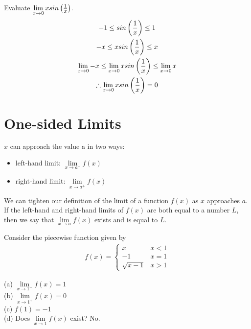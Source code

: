 \begin{exercise}\nonumber
	Evaluate $ \lim\limits_{x \rightarrow 0}xsin\left({1 \over x}\right) $. \\
	\begin{gather*}
		-1 \le  sin\left({1 \over x}\right) \le 1 \\
		-x \le xsin\left({1 \over x}\right) \le x \\
		\lim\limits_{x \rightarrow 0}-x \le \lim\limits_{x \rightarrow 0}xsin\left({1 \over x}\right) \le \lim\limits_{x \rightarrow 0}x \\
		\therefore \lim\limits_{x \rightarrow 0}xsin\left({1 \over x}\right) = 0
	\end{gather*}
\end{exercise}

\section{One-sided Limits}

$ x $ can approach the value a in two ways: \\

\begin{itemize}
	\item
	      left-hand limit: $ \lim\limits_{x \rightarrow a^-}f(x) $ \\

	\item
	      right-hand limit: $ \lim\limits_{x \rightarrow a^+}f(x) $ \\
\end{itemize}

We can tighten our definition of the limit of a function $ f(x) $ as $ x $ approaches $ a $. If the left-hand and right-hand limits of $ f(x) $ are both equal to a number $ L $, then we say that $ \lim\limits_{x \rightarrow a}f(x) $ exists and is equal to $ L $. \\

\begin{exercise}\nonumber
	Consider the piecewise function given by \\
	\begin{align}
		f(x) = \begin{cases}
			x          & x < 1 \\
			-1         & x = 1 \\
			\sqrt{x-1} & x > 1
		\end{cases}
	\end{align}

	(a) $ \lim\limits_{x \rightarrow 1^-}f(x) = 1 $ \\

	(b) $ \lim\limits_{x \rightarrow 1^+}f(x) = 0 $ \\

	(c) $ f(1) = -1 $ \\

	(d) Does $ \lim\limits_{x \rightarrow 1}f(x) $ exist? No.
\end{exercise}

